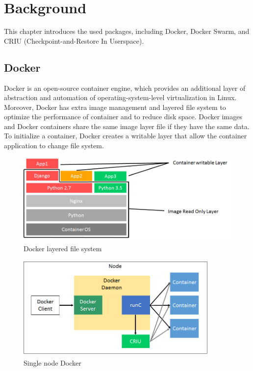 \chapter{Background}
\label{chap:background}

This chapter introduces the used packages, including Docker, Docker Swarm, and CRIU (Checkpoint-and-Restore In Userspace).

\section{Docker}
Docker is an open-source container engine, which provides an additional layer of abstraction and automation of operating-system-level virtualization in Linux.  Moreover, Docker has extra image management and layered file system to optimize the performance of container and to reduce disk space. Docker images and Docker containers share the same image layer file if they have the same data. To initialize a container, Docker creates a writable layer that allow the container application to change file system.  

\begin{figure}[h]
\begin{center}
\includegraphics[width=15cm]{figure/layered_file_system.png}
\end{center}
\caption{Docker layered file system}
\label{fig:Docker layered file system}
\end{figure}

\begin{figure}[h]
\begin{center}
\includegraphics[width=10cm]{figure/single_node.png}
\end{center}
\caption{Single node Docker}
\end{figure}

